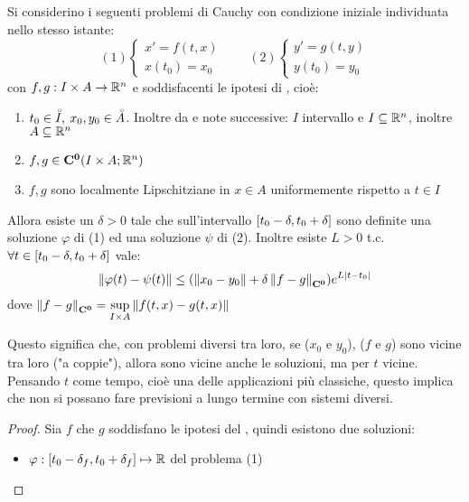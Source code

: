 \begin{theorem}
	\label{teo:cau_locale_part_2}
	Si considerino i seguenti problemi di Cauchy con condizione iniziale individuata nello stesso istante:
	\begin{equation}
		\label{eq:ipot_cau_part_2}
		(1)\begin{cases}x'=f(t,x)\\x(t_0)=x_0\end{cases}\qquad
		(2)\begin{cases}y'=g(t,y)\\y(t_0)=y_0\end{cases}
	\end{equation}
	con $f,g:I\times A \to \mathbb{R}^n$ e soddisfacenti le ipotesi di , cioè:
	\begin{enumerate}
		\item $t_0\in \accentset{\circ}{I},\:x_0,y_0\in \accentset{\circ}{A}$. Inoltre da  e note successive: $I$ intervallo e $I\subseteq \mathbb{R}^n$, inoltre $A\subseteq \mathbb{R}^n$
		\item $f,g\in \mathbf{C^{0}}(I\times A; \mathbb{R}^n)$
		\item $f,g$ sono localmente Lipschitziane in $x\in A$ uniformemente rispetto a $t\in I$
	\end{enumerate}
	Allora esiste un $\delta >0$ tale che sull'intervallo $\left[t_0-\delta,t_0+\delta\right]$ sono definite una soluzione $\varphi$ di (1) ed una soluzione $\psi$ di (2). Inoltre esiste $L>0$ t.c. $\forall t\in \left[t_0-\delta,t_0+\delta\right]$ vale:
	$$\left\|\varphi(t)-\psi(t)\right\| \le (\left\|x_0-y_0\right\|+\delta\left\|f-g\right\|_{\mathbf{C^{0}}})e^{L\left|t-t_0\right|}$$
	dove $\left\|f-g\right\|_{\mathbf{C^{0}}}=\sup\limits_{I\times A}\left\|f(t,x)-g(t,x)\right\|$
	\begin{note}
		Questo significa che, con problemi diversi tra loro, se ($x_0$ e $y_0$), ($f$ e $g$) sono vicine tra loro ("a coppie"), allora sono vicine anche le soluzioni, ma per $t$ vicine.
		Pensando $t$ come tempo, cioè una delle applicazioni più classiche, questo implica che non si possano fare previsioni a lungo termine con sistemi diversi.
	\end{note}
	\begin{proof}
		Sia $f$ che $g$ soddisfano le ipotesi del , quindi esistono due soluzioni:
		\begin{itemize}
			\item $\varphi:\left[t_0-\delta_f,t_0+\delta_f\right]\mapsto\mathbb{R}$ del problema (1)

\end{itemize}
\end{proof}
\end{theorem}
